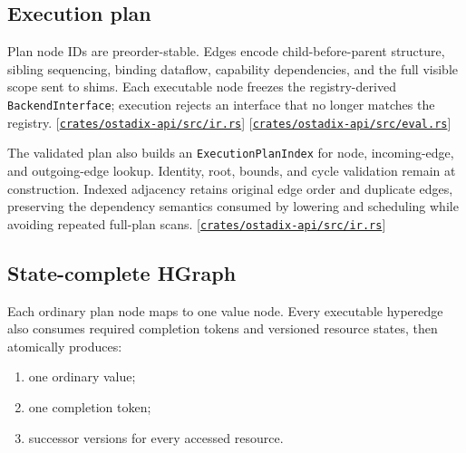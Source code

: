 \documentclass[11pt,oneside]{article}
\newcommand{\src}[1]{\textcolor{OSlate}{\scriptsize[\href{https://github.com/lostadi/OSTADIX/blob/c0b02c326b2329a95ba52447c7180bc93957cd57/#1}{\nolinkurl{#1}}]}\allowbreak}
\begin{document}
\subsection{Execution plan}

Plan node IDs are preorder-stable. Edges encode child-before-parent
structure, sibling sequencing, binding dataflow, capability dependencies, and
the full visible scope sent to shims. Each executable node freezes the
registry-derived \texttt{BackendInterface}; execution rejects an interface
that no longer matches the registry. \src{crates/ostadix-api/src/ir.rs} \src{crates/ostadix-api/src/eval.rs}

The validated plan also builds an \texttt{ExecutionPlanIndex} for node,
incoming-edge, and outgoing-edge lookup. Identity, root, bounds, and cycle
validation remain at construction. Indexed adjacency retains original edge
order and duplicate edges, preserving the dependency semantics consumed by
lowering and scheduling while avoiding repeated full-plan scans.
\src{crates/ostadix-api/src/ir.rs}

\subsection{State-complete HGraph}

Each ordinary plan node maps to one value node. Every executable hyperedge
also consumes required completion tokens and versioned resource states, then
atomically produces:

\begin{enumerate}
  \item one ordinary value;
  \item one completion token;
  \item successor versions for every accessed resource.
\end{enumerate}
\end{document}
